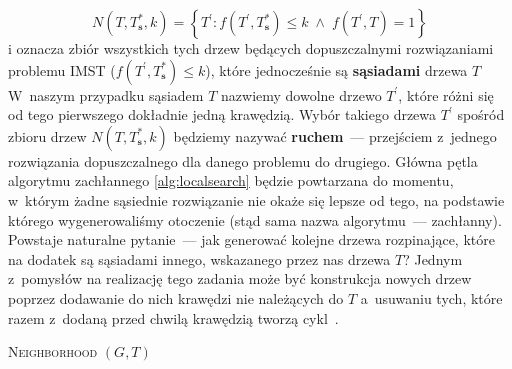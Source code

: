 \begin{equation}
	N \left( T, T^{\ast}_{\textbf{s}}, k \right) = \left\{ T^{\prime} : f \left( T^{\prime}, T^{\ast}_{\textbf{s}} \right) \leqslant k \; \wedge \; f \left( T^{\prime}, T \right) = 1 \right\}
\end{equation}
i oznacza zbiór wszystkich tych drzew będących dopuszczalnymi rozwiązaniami problemu \textsc{IMST} ($f \left( T^{\prime}, T^{\ast}_{\textbf{s}} \right) \leqslant k$), które jednocześnie są \textbf{sąsiadami} drzewa $T$
W~naszym przypadku sąsiadem $T$ nazwiemy dowolne drzewo $T^{\prime}$, które różni się od tego pierwszego dokładnie jedną krawędzią. Wybór takiego drzewa $T^{\prime}$ spośród zbioru drzew $N \left( T, T^{\ast}_{\textbf{s}}, k \right)$ będziemy nazywać \textbf{ruchem}~--- przejściem z~jednego rozwiązania dopuszczalnego dla danego problemu do drugiego.
Główna pętla algorytmu zachłannego \ref{alg:localsearch} będzie powtarzana do momentu, w~którym żadne sąsiednie rozwiązanie nie okaże się lepsze od tego, na podstawie którego wygenerowaliśmy otoczenie (stąd sama nazwa algorytmu~--- zachłanny).
Powstaje naturalne pytanie~--- jak generować kolejne drzewa rozpinające, które na dodatek są sąsiadami innego, wskazanego przez nas drzewa $T$?
Jednym z~pomysłów na realizację tego zadania może być konstrukcja nowych drzew poprzez dodawanie do nich krawędzi nie należących do $T$ a~usuwaniu tych, które razem z~dodaną przed chwilą krawędzią tworzą cykl~\cite{Kasperski2012}.

\begin{pseudokod}[!hbtp]
	\DontPrintSemicolon
	\caption{
		\textsc{Neighborhood} $\left( G, T \right)$
	}
	\label{alg:neighborhood}
\end{pseudokod}

